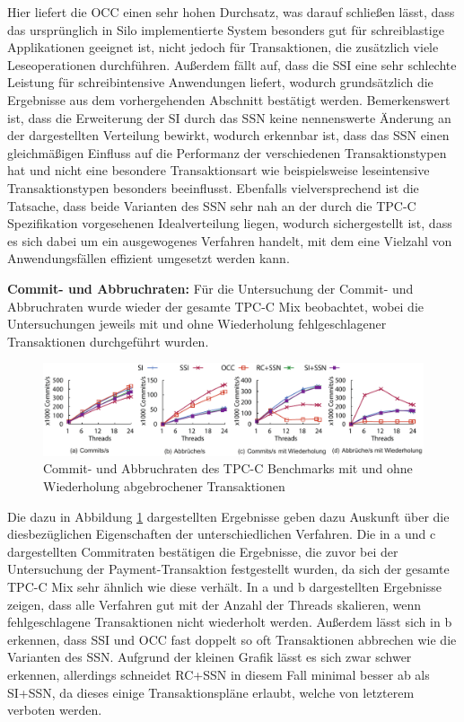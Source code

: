 Hier liefert die OCC einen sehr hohen Durchsatz, was darauf schließen lässt, dass das ursprünglich in Silo implementierte System besonders gut für schreiblastige Applikationen geeignet ist, nicht jedoch für Transaktionen, die zusätzlich viele Leseoperationen durchführen.
Außerdem fällt auf, dass die SSI eine sehr schlechte Leistung für schreibintensive Anwendungen liefert, wodurch grundsätzlich die Ergebnisse aus dem vorhergehenden Abschnitt bestätigt werden.
Bemerkenswert ist, dass die Erweiterung der SI durch das SSN keine nennenswerte Änderung an der dargestellten Verteilung bewirkt, wodurch erkennbar ist, dass das SSN einen gleichmäßigen Einfluss auf die Performanz der verschiedenen Transaktionstypen hat und nicht eine besondere Transaktionsart wie beispielsweise leseintensive Transaktionstypen besonders beeinflusst.
Ebenfalls vielversprechend ist die Tatsache, dass beide Varianten des SSN sehr nah an der durch die TPC-C Spezifikation vorgesehenen Idealverteilung liegen, wodurch sichergestellt ist, dass es sich dabei um ein ausgewogenes Verfahren handelt, mit dem eine Vielzahl von Anwendungsfällen effizient umgesetzt werden kann.

\textbf{Commit- und Abbruchraten:} Für die Untersuchung der Commit- und Abbruchraten wurde wieder der gesamte TPC-C Mix beobachtet, wobei die Untersuchungen jeweils mit und ohne Wiederholung fehlgeschlagener Transaktionen durchgeführt wurden.

\begin{figure}
	\includegraphics[width=\textwidth]{img/Figure_5_original.pdf}
	\caption{Commit- und Abbruchraten des TPC-C Benchmarks mit und ohne Wiederholung abgebrochener Transaktionen}
	\label{fig:commit_abort}
\end{figure}

Die dazu in Abbildung \ref{fig:commit_abort} dargestellten Ergebnisse geben dazu Auskunft über die diesbezüglichen Eigenschaften der unterschiedlichen Verfahren.
Die in a und c dargestellten Commitraten bestätigen die Ergebnisse, die zuvor bei der Untersuchung der Payment-Transaktion festgestellt wurden, da sich der gesamte TPC-C Mix sehr ähnlich wie diese verhält.
In a und b dargestellten Ergebnisse zeigen, dass alle Verfahren gut mit der Anzahl der Threads skalieren, wenn fehlgeschlagene Transaktionen nicht wiederholt werden.
Außerdem lässt sich in b erkennen, dass SSI und OCC fast doppelt so oft Transaktionen abbrechen wie die Varianten des SSN.
Aufgrund der kleinen Grafik lässt es sich zwar schwer erkennen, allerdings schneidet RC+SSN in diesem Fall minimal besser ab als SI+SSN, da dieses einige Transaktionspläne erlaubt, welche von letzterem verboten werden.


